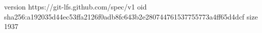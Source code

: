 version https://git-lfs.github.com/spec/v1
oid sha256:a192035d44ec53ffa2126f0adb8fc643b2e280744761537755773a4ff65d4dcf
size 1937
